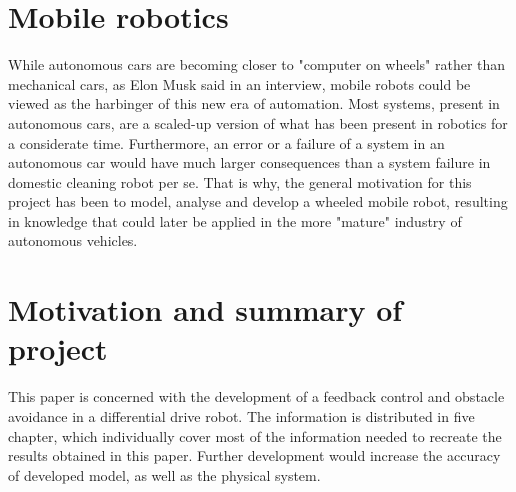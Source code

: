 \section{Mobile robotics}

While autonomous cars are becoming closer to "computer on wheels" rather than mechanical cars, as Elon Musk said in an interview, mobile robots could be viewed as the harbinger of this new era of automation.\cite{ElonMusk} Most systems, present in autonomous cars, are a scaled-up version of what has been present in robotics for a considerate time. Furthermore, an error or a failure of a system in an autonomous car would have much larger consequences than a system failure in domestic cleaning robot per se.
That is why, the general motivation for this project has been to model, analyse and develop a wheeled mobile robot, resulting in knowledge that could later be applied in the more "mature" industry of autonomous vehicles. 

\section{Motivation and summary of project}
This paper is concerned with the development of a feedback control and obstacle avoidance in a differential drive robot. The information is distributed in five chapter, which individually cover most of the information needed to recreate the results obtained in this paper. Further development would increase the accuracy of developed model, as well as the physical system.    